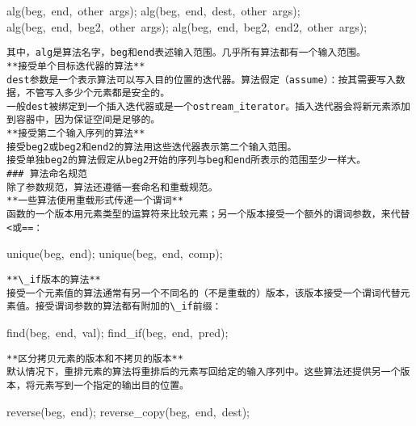 \documentclass[
  a4paper,
  oneside,tablecaptionabove
]{scrbook}
\begin{document}
alg(beg,~end,~other~args); alg(beg,~end,~dest,~other~args);
alg(beg,~end,~beg2,~other~args); alg(beg,~end,~beg2,~end2,~other~args);

\begin{lstlisting}
其中，alg是算法名字，beg和end表述输入范围。几乎所有算法都有一个输入范围。  
**接受单个目标迭代器的算法**  
dest参数是一个表示算法可以写入目的位置的迭代器。算法假定（assume）：按其需要写入数据，不管写入多少个元素都是安全的。  
一般dest被绑定到一个插入迭代器或是一个ostream_iterator。插入迭代器会将新元素添加到容器中，因为保证空间是足够的。  
**接受第二个输入序列的算法**  
接受beg2或beg2和end2的算法用这些迭代器表示第二个输入范围。  
接受单独beg2的算法假定从beg2开始的序列与beg和end所表示的范围至少一样大。  
### 算法命名规范  
除了参数规范，算法还遵循一套命名和重载规范。  
**一些算法使用重载形式传递一个谓词**  
函数的一个版本用元素类型的运算符来比较元素；另一个版本接受一个额外的谓词参数，来代替<或==：  
\end{lstlisting}

unique(beg,~end); unique(beg,~end,~comp);

\begin{lstlisting}
**\_if版本的算法**  
接受一个元素值的算法通常有另一个不同名的（不是重载的）版本，该版本接受一个谓词代替元素值。接受谓词参数的算法都有附加的\_if前缀：  
\end{lstlisting}

find(beg,~end,~val); find\_if(beg,~end,~pred);

\begin{lstlisting}
**区分拷贝元素的版本和不拷贝的版本**  
默认情况下，重排元素的算法将重排后的元素写回给定的输入序列中。这些算法还提供另一个版本，将元素写到一个指定的输出目的位置。  
\end{lstlisting}

reverse(beg,~end); reverse\_copy(beg,~end,~dest);
\end{document}
